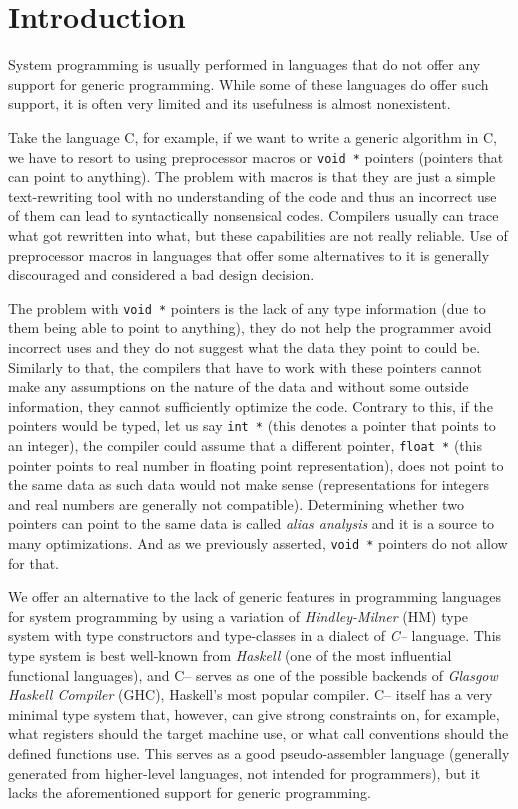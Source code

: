 \documentclass[12pt,a4paper]{report}
\begin{document}
\chapter*{Introduction}

System programming is usually performed in languages that do not offer any support for generic programming. While some of these languages do offer such support, it is often very limited and its usefulness is almost nonexistent.

Take the language C, for example, if we want to write a generic algorithm in C, we have to resort to using preprocessor macros or \texttt{void *} pointers (pointers that can point to anything). The problem with macros is that they are just a simple text-rewriting tool with no understanding of the code and thus an incorrect use of them can lead to syntactically nonsensical codes. Compilers usually can trace what got rewritten into what, but these capabilities are not really reliable. Use of preprocessor macros in languages that offer some alternatives to it is generally discouraged and considered a bad design decision.

The problem with \texttt{void *} pointers is the lack of any type information (due to them being able to point to anything), they do not help the programmer avoid incorrect uses and they do not suggest what the data they point to could be. Similarly to that, the compilers that have to work with these pointers cannot make any assumptions on the nature of the data and without some outside information, they cannot sufficiently optimize the code. Contrary to this, if the pointers would be typed, let us say \texttt{int *} (this denotes a pointer that points to an integer), the compiler could assume that a different pointer, \texttt{float *} (this pointer points to real number in floating point representation), does not point to the same data as such data would not make sense (representations for integers and real numbers are generally not compatible). Determining whether two pointers can point to the same data is called \textit{alias analysis} and it is a source to many optimizations. And as we previously asserted, \texttt{void *} pointers do not allow for that.

We offer an alternative to the lack of generic features in programming languages for system programming by using a variation of \textit{Hindley-Milner} (HM) type system with type constructors and type-classes in a dialect of \textit{C--} language. This type system is best well-known from \textit{Haskell} (one of the most influential functional languages), and C-- serves as one of the possible backends of \textit{Glasgow Haskell Compiler} (GHC), Haskell's most popular compiler. C-- itself has a very minimal type system that, however, can give strong constraints on, for example, what registers should the target machine use, or what call conventions should the defined functions use. This serves as a good pseudo-assembler language (generally generated from higher-level languages, not intended for programmers), but it lacks the aforementioned support for generic programming.
\end{document}
